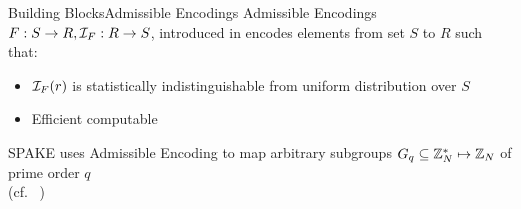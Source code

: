 \documentclass[notes]{beamer}
\begin{document}

\begin{frame}{Building Blocks}{Admissible Encodings}
	Admissible Encodings $F:S\rightarrow R, \mathcal{I}_F:R\rightarrow S$, introduced in \cite{BonehF01,BrierCIMRT10,pseudorandomSignatures} encodes elements from set $S$ to $R$ such that: %
	\begin{itemize}
		\item $\mathcal{I}_F(r)$ is statistically indistinguishable from uniform distribution over $S$
		\item Efficient computable
	\end{itemize}
	
	\pause\vspace*{1em}
	
		SPAKE uses Admissible Encoding to map arbitrary subgroups $G_q \subseteq \mathbb{Z}_N^\ast \mapsto \mathbb{Z}_N$ of prime order $q$\\ (cf. ~\cite[Lemma~12]{pseudorandomSignatures}) %
	
\end{frame}

%

\end{document}
